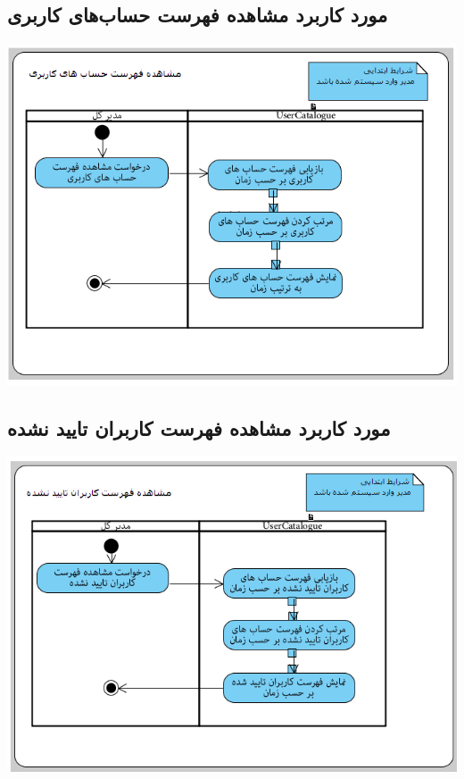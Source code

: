 \subsection*{مورد کاربرد مشاهده فهرست حساب‌های کاربری}
\vspace{2cm}
\begin{center}
\includegraphics[width=\textwidth]{ActivityDiagramsWithSwimlanes/2.png}
\end{center}

\newpage
\vspace{2cm}
\subsection*{مورد کاربرد مشاهده فهرست کاربران تایید نشده}
\vspace{2cm}
\begin{center}
\includegraphics[width=\textwidth]{ActivityDiagramsWithSwimlanes/3.png}
\end{center}

